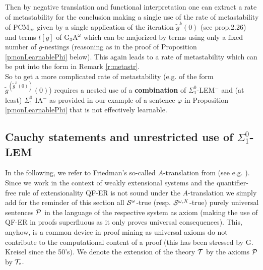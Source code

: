Then by negative translation and functional interpretation one can 
extract a rate of metastability for the conclusion 
making a single use of the rate of 
metastability of PCM$_{ar}$ given by a single application of the iteration 
$\tilde{g}^{k}(0)$ (see \cite{Kohlenbach08} prop.2.26) 
and terms $t[g]$ of G$_3$A$^{\omega}$ which can be 
majorized by terms using only a fixed number of $g$-nestings (reasoning 
as in the proof of Proposition \ref{p:nonLearnablePhi} below). 
This again leads to a rate of 
metastability which can be put into the form in Remark \ref{r:metastr}.\\[1mm] 
So to get a more complicated rate of metastability (e.g. of the form 
$\tilde{g}^{(\tilde{g}^x(0))}(0)$) requires a nested use of a {\bf combination} of 
$\Sigma^0_1$-LEM$^-$ and (at least) 
$\Sigma^0_1$-IA$^-$ as provided in our example 
of a sentence $\varphi$ in Proposition 
\ref{p:nonLearnablePhi} that is not effectively learnable.
 

\subsection{Cauchy statements and unrestricted use of $\Sigma^0_1$-LEM}
In the following, we refer to Friedman's so-called $A$-translation from 
\cite{Friedman(78)} (see e.g. \cite{Kohlenbach08}). Since we 
work in the context of weakly extensional systems and the quantifier-free 
rule of extensionality QF-ER is not sound under the $A$-translation we simply 
add for the reminder of this section 
all ${\cal S}^{\omega}$-true (resp. ${\cal S}^{\omega,X}$-true) purely 
universal sentences ${\cal P}$ in the language of the respective system 
as axiom (making the use of QF-ER in proofs superfluous as it only proves 
universal consequences). This, anyhow, is a common device in proof mining 
as universal axioms do not contribute to the computational content of a 
proof (this has been stressed by G. Kreisel since the 50's). We denote 
the extension of the theory ${\cal T}$ by the axioms ${\cal P}$ by 
${\cal T}_*.$ 

